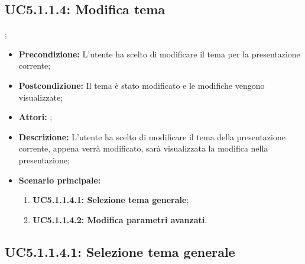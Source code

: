 \subsection{ UC5.1.1.4: Modifica tema}
;
\begin{itemize}
	\item \textbf{Precondizione:} L’utente ha scelto di modificare il tema per la presentazione corrente;
	\item \textbf{Postcondizione:} Il tema è stato modificato e le modifiche vengono visualizzate;
	\item \textbf{Attori:} ;
	\item \textbf{Descrizione:} L'utente ha scelto di modificare il tema della presentazione corrente, appena verrà modificato, sarà visualizzata la modifica nella presentazione;
	\item \textbf{Scenario principale:}
	\begin{enumerate}
		\item \textbf{ UC5.1.1.4.1: Selezione tema generale};
		\item \textbf{ UC5.1.1.4.2: Modifica parametri avanzati}.
	\end{enumerate}
\end{itemize}
\subsection{ UC5.1.1.4.1: Selezione tema generale}

